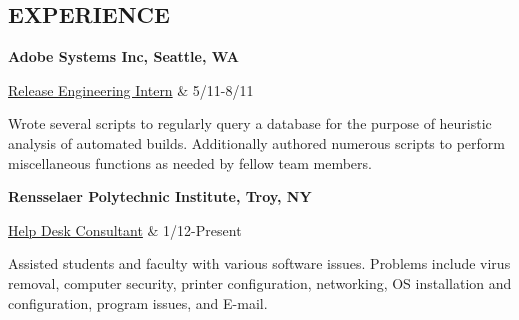 \documentclass[margin,11pt]{res} %
\begin{document}
\begin{resume}
\section{EXPERIENCE}     {\bf Adobe Systems Inc, Seattle, WA}  \\
                \begin{ncolumn}{2} %
                  \underline{Release Engineering Intern}     &      5/11-8/11
                \end{ncolumn}

              Wrote several scripts to regularly query a database for the purpose of heuristic analysis of automated builds. Additionally authored numerous scripts to perform miscellaneous functions as needed by fellow team members.      

                {\bf Rensselaer Polytechnic Institute, Troy, NY} \\
                \begin{ncolumn}{2}
                  \underline{Help Desk Consultant}     &      1/12-Present
                \end{ncolumn}

                Assisted students and faculty with various software issues. Problems include virus removal, computer security, printer configuration, networking, OS installation and configuration, program issues, and E-mail.
\end{resume} 
\end{document}
